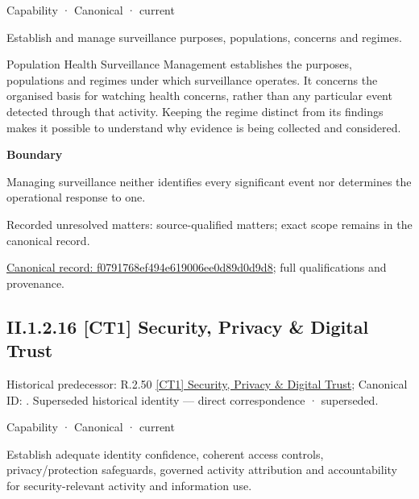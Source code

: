 \label{element:f0791768ef494e619006ee0d89d0d9d8}
{\small Capability · Canonical · current}\par

Establish and manage surveillance purposes, populations, concerns and regimes.



Population Health Surveillance Management establishes the purposes, populations and regimes under which surveillance operates. It concerns the organised basis for watching health concerns, rather than any particular event detected through that activity. Keeping the regime distinct from its findings makes it possible to understand why evidence is being collected and considered.



\textbf{Boundary}



Managing surveillance neither identifies every significant event nor determines the operational response to one.


{\small Recorded unresolved matters: source-qualified matters; exact scope remains in the canonical record.}\par
{\footnotesize \href{../../../../../../../continuum/strategy/capability/f0791768ef494e619006ee0d89d0d9d8.md}{Canonical record: f0791768ef494e619006ee0d89d0d9d8}; full qualifications and provenance.}\par
\subsection*{II.1.2.16 [CT1] Security, Privacy \& Digital Trust}
\label{navigation:II.1.2.16}

{\small Historical predecessor: R.2.50 \hyperref[element:b01441b2f5584fc2b9c3988643a7c93b]{[CT1] Security, Privacy \& Digital Trust}; Canonical ID: \texttt{}. Superseded historical identity — direct correspondence · superseded.}\par
\label{element:71f0431fdfcd4f779e16d9e5ea609833}
{\small Capability · Canonical · current}\par

Establish adequate identity confidence, coherent access controls, privacy/protection safeguards, governed activity attribution and accountability for security-relevant activity and information use.



